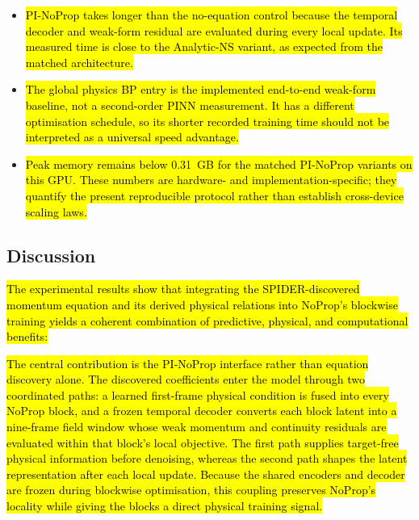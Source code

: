 \documentclass[preprint,12pt]{elsarticle}
\newcommand{\rev}[1]{\hl{#1}}
\begin{document}
\begin{itemize}
    \item \rev{PI-NoProp takes longer than the no-equation control because the temporal decoder and weak-form residual are evaluated during every local update. Its measured time is close to the Analytic-NS variant, as expected from the matched architecture.}
    \item \rev{The global physics BP entry is the implemented end-to-end weak-form baseline, not a second-order PINN measurement. It has a different optimisation schedule, so its shorter recorded training time should not be interpreted as a universal speed advantage.}
    \item \rev{Peak memory remains below 0.31~GB for the matched PI-NoProp variants on this GPU. These numbers are hardware- and implementation-specific; they quantify the present reproducible protocol rather than establish cross-device scaling laws.}
\end{itemize}

\subsection{Discussion}
\label{sec:discussion}

\rev{The experimental results show that integrating the SPIDER-discovered momentum equation and its derived physical relations into NoProp's blockwise training yields a coherent combination of predictive, physical, and computational benefits:}

\rev{The central contribution is the PI-NoProp interface rather than equation discovery alone. The discovered coefficients enter the model through two coordinated paths: a learned first-frame physical condition is fused into every NoProp block, and a frozen temporal decoder converts each block latent into a nine-frame field window whose weak momentum and continuity residuals are evaluated within that block's local objective. The first path supplies target-free physical information before denoising, whereas the second path shapes the latent representation after each local update. Because the shared encoders and decoder are frozen during blockwise optimisation, this coupling preserves NoProp's locality while giving the blocks a direct physical training signal.}
\end{document}
